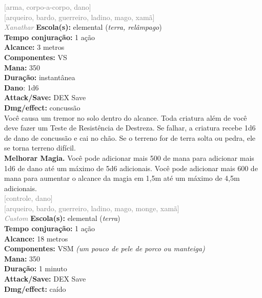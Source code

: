 \documentclass{RPG_Adventure}[2021/10/20]
\begin{document}
{\scriptsize \textcolor{gray}{[arma, corpo-a-corpo, dano]\\}}
{\scriptsize \textcolor{gray}{[arqueiro, bardo, guerreiro, ladino, mago, xamã]\\}}
{\tiny \textcolor{gray}{\textit{Xanathar}}}\jump{}
{\small \t \textbf{Escola(s):} elemental (\textit{terra, relâmpago})\\\t \textbf{Tempo conjuração:} 1 ação\\\t \textbf{Alcance:} 3 metros\\\t \textbf{Componentes:} VS\\\t \textbf{Mana:} 350\\\t \textbf{Duração:} instantânea\\\t \textbf{Dano}: 1d6\\\t \textbf{Attack/Save:} DEX Save\\\t \textbf{Dmg/effect:} concussão\\}
{\normalsize Você causa um tremor no solo dentro do alcance. Toda criatura além de você deve fazer um Teste de Resistência de Destreza. Se falhar, a criatura recebe 1d6 de dano de concussão e cai no chão. Se o terreno for de terra solta ou pedra, ele se torna terreno difícil.\\\t \textbf{Melhorar Magia.} Você pode adicionar mais 500 de mana para adicionar mais 1d6 de dano até um máximo de 5d6 adicionais. Você pode adicionar mais 600 de mana para aumentar o alcance da magia em 1,5m até um máximo de 4,5m adicionais.\\}
{\scriptsize \textcolor{gray}{[controle, dano]\\}}
{\scriptsize \textcolor{gray}{[arqueiro, bardo, guerreiro, ladino, mago, monge, xamã]\\}}
{\tiny \textcolor{gray}{\textit{Custom}}}\jump{}
{\small \t \textbf{Escola(s):} elemental (\textit{terra})\\\t \textbf{Tempo conjuração:} 1 ação\\\t \textbf{Alcance:} 18 metros\\\t \textbf{Componentes:} VSM \textit{(um pouco de pele de porco ou manteiga)}\\\t \textbf{Mana:} 350\\\t \textbf{Duração:} 1 minuto\\\t \textbf{Attack/Save:} DEX Save\\\t \textbf{Dmg/effect:} caído\\}
\end{document}
